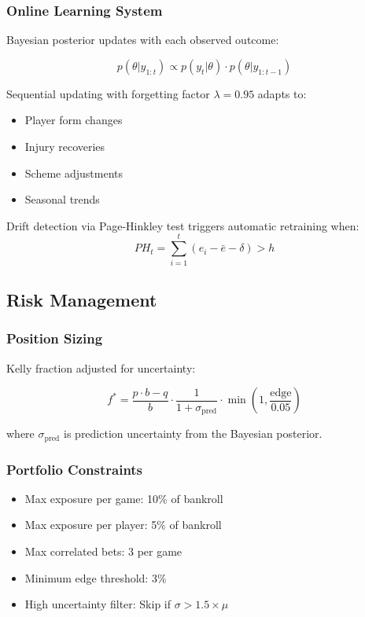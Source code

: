 \subsubsection{Online Learning System}

Bayesian posterior updates with each observed outcome:

\begin{equation}
p(\theta | y_{1:t}) \propto p(y_t | \theta) \cdot p(\theta | y_{1:t-1})
\end{equation}

Sequential updating with forgetting factor $\lambda = 0.95$ adapts to:
\begin{itemize}
  \item Player form changes
  \item Injury recoveries
  \item Scheme adjustments
  \item Seasonal trends
\end{itemize}

Drift detection via Page-Hinkley test triggers automatic retraining when:
\begin{equation}
PH_t = \sum_{i=1}^t (e_i - \bar{e} - \delta) > h
\end{equation}

\subsection{Risk Management}

\subsubsection{Position Sizing}

Kelly fraction adjusted for uncertainty:

\begin{equation}
f^* = \frac{p \cdot b - q}{b} \cdot \frac{1}{1 + \sigma_{\text{pred}}} \cdot \min\left(1, \frac{\text{edge}}{0.05}\right)
\end{equation}

where $\sigma_{\text{pred}}$ is prediction uncertainty from the Bayesian posterior.

\subsubsection{Portfolio Constraints}

\begin{itemize}
  \item Max exposure per game: 10\% of bankroll
  \item Max exposure per player: 5\% of bankroll
  \item Max correlated bets: 3 per game
  \item Minimum edge threshold: 3\%
  \item High uncertainty filter: Skip if $\sigma > 1.5 \times \mu$
\end{itemize}

